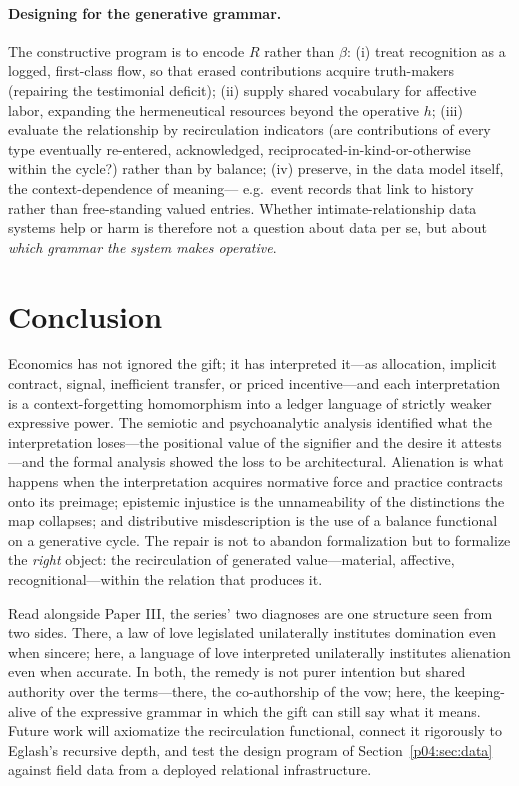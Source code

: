 \paragraph{Designing for the generative grammar.}
The constructive program is to encode $R$ rather than $\beta$:
(i) treat recognition as a logged, first-class flow, so that erased
contributions acquire truth-makers (repairing the testimonial deficit);
(ii) supply shared vocabulary for affective labor, expanding the
hermeneutical resources beyond the operative $h$;
(iii) evaluate the relationship by recirculation indicators (are
contributions of every type eventually re-entered, acknowledged,
reciprocated-in-kind-or-otherwise within the cycle?) rather than by balance;
(iv) preserve, in the data model itself, the context-dependence of meaning---
e.g.\ event records that link to history rather than free-standing valued
entries. Whether intimate-relationship data systems help or harm is therefore
not a question about data per se, but about \emph{which grammar the system
makes operative}.

\section{Conclusion}
\label{p04:sec:conclusion}

Economics has not ignored the gift; it has interpreted it---as allocation,
implicit contract, signal, inefficient transfer, or priced incentive---and
each interpretation is a context-forgetting homomorphism into a ledger
language of strictly weaker expressive power. The semiotic and
psychoanalytic analysis identified what the interpretation loses---the
positional value of the signifier and the desire it attests---and the formal
analysis showed the loss to be architectural. Alienation is what happens when
the interpretation acquires normative force and practice contracts onto its
preimage; epistemic injustice is the unnameability of the distinctions the
map collapses; and distributive misdescription is the use of a balance
functional on a generative cycle. The repair is not to abandon formalization
but to formalize the \emph{right} object: the recirculation of generated
value---material, affective, recognitional---within the relation that
produces it.

Read alongside Paper III, the series' two diagnoses are one structure seen
from two sides. There, a law of love legislated unilaterally institutes
domination even when sincere; here, a language of love interpreted
unilaterally institutes alienation even when accurate. In both, the remedy is
not purer intention but shared authority over the terms---there, the
co-authorship of the vow; here, the keeping-alive of the expressive grammar
in which the gift can still say what it means. Future work will axiomatize
the recirculation functional, connect it rigorously to Eglash's recursive
depth, and test the design program of Section~\ref{p04:sec:data} against field
data from a deployed relational infrastructure.

